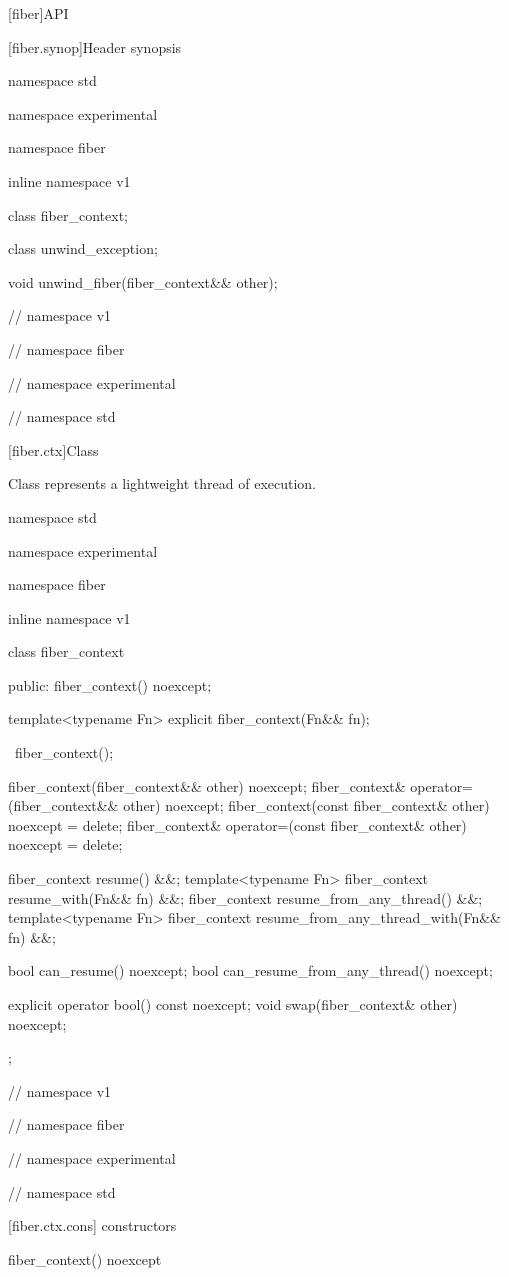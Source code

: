 [fiber]{API}

[fiber.synop]{Header  synopsis}

\begin{codeblock}
namespace std {
namespace experimental {
namespace fiber {
inline namespace v1 {

class fiber_context;

class unwind_exception;

void unwind_fiber(fiber_context&& other);

} // namespace v1
} // namespace fiber
} // namespace experimental
} // namespace std
\end{codeblock}

[fiber.ctx]{Class }

\pnum
Class  represents a lightweight thread of execution.

\begin{codeblock}
namespace std {
namespace experimental {
namespace fiber {
inline namespace v1 {

class fiber_context {
public:
    fiber_context() noexcept;

    template<typename Fn>
    explicit fiber_context(Fn&& fn);

    ~fiber_context();

    fiber_context(fiber_context&& other) noexcept;
    fiber_context& operator=(fiber_context&& other) noexcept;
    fiber_context(const fiber_context& other) noexcept = delete;
    fiber_context& operator=(const fiber_context& other) noexcept = delete;

    fiber_context resume() &&;
    template<typename Fn>
    fiber_context resume_with(Fn&& fn) &&;
    fiber_context resume_from_any_thread() &&;
    template<typename Fn>
    fiber_context resume_from_any_thread_with(Fn&& fn) &&;

    bool can_resume() noexcept;
    bool can_resume_from_any_thread() noexcept;

    explicit operator bool() const noexcept;
    void swap(fiber_context& other) noexcept;
};

} // namespace v1
} // namespace fiber
} // namespace experimental
} // namespace std
\end{codeblock}


[fiber.ctx.cons]{ constructors}

\begin{itemdecl}
fiber_context() noexcept
\end{itemdecl}

